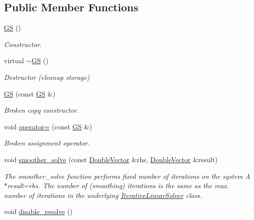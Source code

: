 \subsection*{Public Member Functions}
\begin{DoxyCompactItemize}
\item 
\hyperlink{classoomph_1_1GS_3_01CRDoubleMatrix_01_4_a230c2d26d23fb9c0704581c1b2da5e59}{GS} ()
\begin{DoxyCompactList}\small\item\em Constructor. \end{DoxyCompactList}\item 
virtual \hyperlink{classoomph_1_1GS_3_01CRDoubleMatrix_01_4_af3f4b25c6496b14667881b4777933897}{$\sim$\+GS} ()
\begin{DoxyCompactList}\small\item\em Destructor (cleanup storage) \end{DoxyCompactList}\item 
\hyperlink{classoomph_1_1GS_3_01CRDoubleMatrix_01_4_afc211e223a3f71ecbef9ee8eb9ee05db}{GS} (const \hyperlink{classoomph_1_1GS}{GS} \&)
\begin{DoxyCompactList}\small\item\em Broken copy constructor. \end{DoxyCompactList}\item 
void \hyperlink{classoomph_1_1GS_3_01CRDoubleMatrix_01_4_aa26bdc7f0230aeb37d17f4fd99dbf5c9}{operator=} (const \hyperlink{classoomph_1_1GS}{GS} \&)
\begin{DoxyCompactList}\small\item\em Broken assignment operator. \end{DoxyCompactList}\item 
void \hyperlink{classoomph_1_1GS_3_01CRDoubleMatrix_01_4_a0917e59d120fe7c49ecef62806392f6a}{smoother\+\_\+solve} (const \hyperlink{classoomph_1_1DoubleVector}{Double\+Vector} \&rhs, \hyperlink{classoomph_1_1DoubleVector}{Double\+Vector} \&result)
\begin{DoxyCompactList}\small\item\em The smoother\+\_\+solve function performs fixed number of iterations on the system A$\ast$result=rhs. The number of (smoothing) iterations is the same as the max. number of iterations in the underlying \hyperlink{classoomph_1_1IterativeLinearSolver}{Iterative\+Linear\+Solver} class. \end{DoxyCompactList}\item 
void \hyperlink{classoomph_1_1GS_3_01CRDoubleMatrix_01_4_a41c2dd2610f61fd9e25053511fdd9eab}{disable\+\_\+resolve} ()

\end{DoxyCompactItemize}
